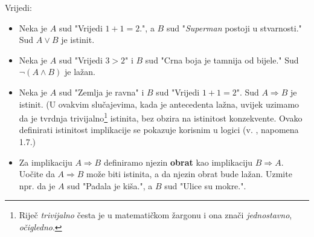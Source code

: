 \begin{exmp} Vrijedi:
\label{16}
\begin{itemize}
\item Neka je $A$ sud "Vrijedi $1+1=2$.", a $B$ sud "\textit{Superman} postoji u stvarnosti." Sud $A\vee B$ je istinit.
\item Neka je $A$ sud "Vrijedi $3>2$" i $B$ sud "Crna boja je tamnija od bijele." Sud $\neg(A\wedge B)$ je lažan.
\item Neka je $A$ sud "Zemlja je ravna" i $B$ sud "Vrijedi $1+1=2$". Sud $A\Rightarrow B$ je istinit. (U ovakvim slučajevima, kada je antecedenta lažna, uvijek uzimamo da je tvrdnja trivijalno\footnote{Riječ \textit{trivijalno} česta je u matematičkom žargonu i ona znači \textit{jednostavno}, \textit{očigledno}.} istinita, bez obzira na istinitost konzekvente. Ovako definirati istinitost implikacije se pokazuje korisnim u logici (v. \cite{1}, napomena 1.7.)
\item Za implikaciju $A\Rightarrow B$ definiramo njezin \textbf{obrat} kao implikaciju $B\Rightarrow A$. Uočite da $A\Rightarrow B$ može biti istinita, a da njezin obrat bude lažan. Uzmite npr. da je $A$ sud "Padala je kiša.", a $B$ sud "Ulice su mokre.".
\end{itemize}
\end{exmp}

